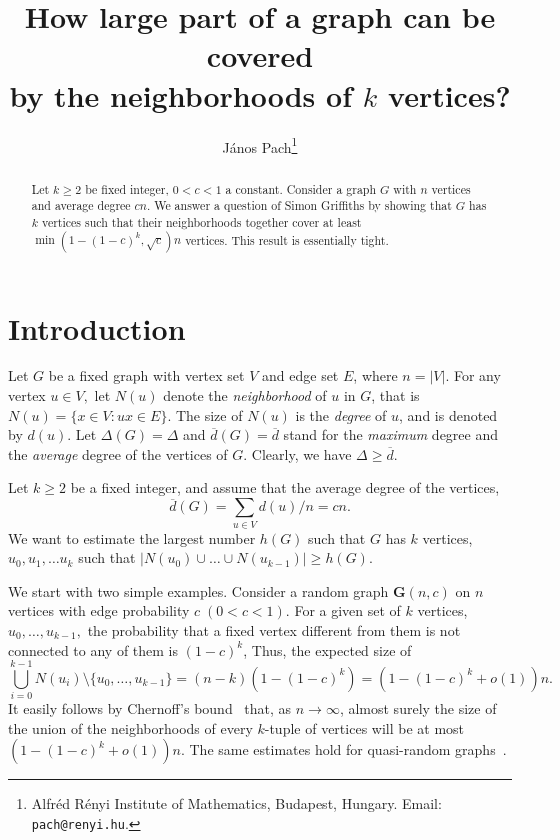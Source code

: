 \documentclass[12pt]{article}
\title{How large part of a graph can be covered\\ by the neighborhoods of $k$ vertices? }
\author{J\'anos Pach\thanks{Alfr\'ed R\'enyi Institute of Mathematics, Budapest, Hungary. Email: \texttt{pach@renyi.hu}.}}
\theoremstyle{plain}
\theoremstyle{definition}
\theoremstyle{remark}
\begin{document}
\date{}

\maketitle


\begin{abstract}
Let $k\ge 2$ be fixed integer, $0<c<1$ a constant. Consider a graph $G$ with $n$ vertices and average degree $cn$. We answer a question of Simon Griffiths by showing that $G$ has $k$ vertices such that their neighborhoods together cover at least $\min(1-(1-c)^{k},\sqrt{c})n$ vertices. This result is essentially tight.
\end{abstract}

\section{Introduction}


Let $G$ be a fixed graph with vertex set $V$ and edge set $E$, where $n=|V|.$  For any vertex $u\in V,$ let $N(u)$ denote the \emph{neighborhood} of $u$ in $G$, that is $N(u)=\{x\in V : ux\in E\}$. The size of $N(u)$ is the \emph{degree} of $u$, and is denoted by $d(u)$. Let $\Delta(G)=\Delta$ and $\overline{d}(G)=\overline{d}$ stand for the \emph{maximum} degree and the \emph{average} degree of the vertices of $G$. Clearly, we have $\Delta\ge\overline{d}.$

Let $k\ge 2$ be a fixed integer, and assume that the average degree of the vertices,
$$\overline{d}(G)=\sum_{u\in V}d(u)/n=cn.$$
We want to estimate the largest number $h(G)$ such that $G$ has $k$ vertices, $u_0, u_1,\ldots u_k$ such that $|N(u_0)\cup\ldots\cup N(u_{k-1})|\ge h(G).$
\smallskip

We start with two simple examples. Consider a random graph $\mathbf{G}(n,c)$ on $n$ vertices with edge probability $c\; (0<c<1)$. For a given set of $k$ vertices, $u_0,\ldots,u_{k-1},$ the probability that a fixed vertex different from them is not connected to any of them is $(1-c)^k$, Thus, the expected size of $$\bigcup_{i=0}^{k-1}N(u_i)\setminus\{u_0,\ldots,u_{k-1}\}=(n-k)(1-(1-c)^k)=(1-(1-c)^k+o(1))n.$$It easily follows by Chernoff's bound~\cite{AS, JLR} that, as $n\rightarrow\infty$, almost surely the size of the union of the neighborhoods of every $k$-tuple of vertices will be at most $(1-(1-c)^k+o(1))n.$ The same estimates hold for quasi-random graphs~\cite{CGW}.
\end{document}
